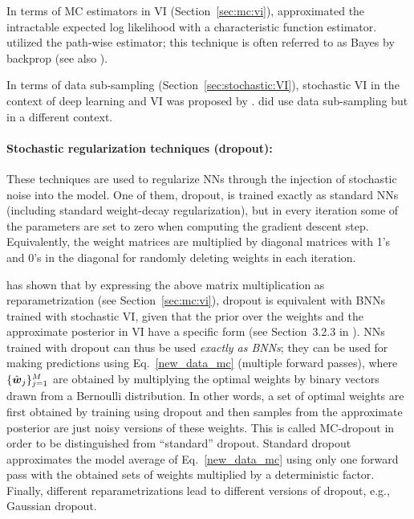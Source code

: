 In terms of MC estimators in VI (Section~\ref{sec:mc:vi}), \textcite{graves2011practical} approximated the intractable expected log likelihood with a characteristic function estimator. 
\textcite{blundell2015weight} utilized the path-wise estimator; this technique is often referred to as Bayes by backprop (see also \cite{kucukelbir2017automatic}). 

In terms of data sub-sampling (Section~\ref{sec:stochastic:VI}), stochastic VI in the context of deep learning and VI was proposed by \textcite{hoffman2013stochastic}.
\textcite{graves2011practical} did use data sub-sampling but in a different context. 

\paragraph{Stochastic regularization techniques (dropout):}
These techniques are used to regularize NNs through the injection of stochastic noise into the model. 
One of them, dropout, is trained exactly as standard NNs (including standard weight-decay regularization), but in every iteration some of the parameters are set to zero when computing the gradient descent step. 
Equivalently, the weight matrices are multiplied by diagonal matrices with 1's and 0's in the diagonal for randomly deleting weights in each iteration. 

\textcite{gal2016uncertainty} has shown that by expressing the above matrix multiplication as reparametrization (see Section~\ref{sec:mc:vi}), dropout is equivalent with BNNs trained with stochastic VI, given that the prior over the weights and the approximate posterior in VI have a specific form (see Section~3.2.3 in \cite{gal2016uncertainty}). 
NNs trained with dropout can thus be used \textit{exactly as BNNs}; they can be used for making predictions using Eq.~\eqref{new_data_mc} (multiple forward passes), where $\{\hat{\boldsymbol{w}}_j\}_{j=1}^M$ are obtained by multiplying the optimal weights by binary vectors drawn from a Bernoulli distribution.
In other words, a set of optimal weights are first obtained by training using dropout and then samples from the approximate posterior are just noisy versions of these weights. 
This is called MC-dropout in order to be distinguished from ``standard'' dropout.
Standard dropout approximates the model average of Eq.~\eqref{new_data_mc} using only one forward pass with the obtained sets of weights multiplied by a deterministic factor.
Finally, different reparametrizations lead to different versions of dropout, e.g., Gaussian dropout.
%
